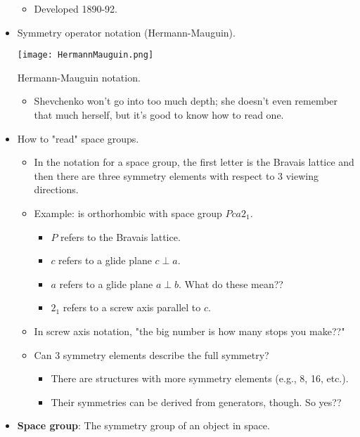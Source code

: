 \documentclass[../notes.tex]{subfiles}
\begin{document}
\begin{itemize}
\begin{itemize}
        \item Developed 1890-92.
    \end{itemize}
    \item Symmetry operator notation (Hermann-Mauguin).
    \begin{table}[H]
        \centering
        \texttt{[image: HermannMauguin.png]}
        \caption{Hermann-Mauguin notation.}
        \label{fig:HermannMauguin}
    \end{table}
    \begin{itemize}
        \item Shevchenko won't go into too much depth; she doesn't even remember that much herself, but it's good to know how to read one.
    \end{itemize}
    \item How to "read" space groups.
    \begin{itemize}
        \item In the notation for a space group, the first letter is the Bravais lattice and then there are three symmetry elements with respect to 3 viewing directions.
        \item Example:  is orthorhombic with space group $Pca2_1$.
        \begin{itemize}
            \item $P$ refers to the Bravais lattice.
            \item $c$ refers to a glide plane $c\perp a$.
            \item $a$ refers to a glide plane $a\perp b$. What do these mean??
            \item $2_1$ refers to a screw axis parallel to $c$.
        \end{itemize}
        \item In screw axis notation, "the big number is how many stops you make??"
        \item Can 3 symmetry elements describe the full symmetry?
        \begin{itemize}
            \item There are structures with more symmetry elements (e.g., 8, 16, etc.).
            \item Their symmetries can be derived from generators, though. So yes??
        \end{itemize}
    \end{itemize}
    \item \textbf{Space group}: The symmetry group of an object in space.
    \begin{itemize}

\end{itemize}
\end{itemize}
\end{document}
